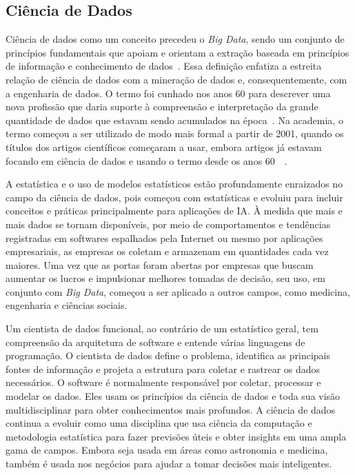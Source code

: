 \documentclass[portugues]{ic-tese}
\begin{document}
\subsection{Ciência de Dados}

Ciência de dados como um conceito precedeu o \textit{Big Data}, sendo um conjunto de princípios fundamentais que apoiam e orientam a extração baseada em princípios de informação e conhecimento de dados~\citep{Raban_2020}. Essa definição enfatiza a estreita relação de ciência de dados com a mineração de dados e, consequentemente, com a engenharia de dados. O termo foi cunhado nos anos 60 para descrever uma nova profissão que daria suporte à compreensão e interpretação da grande quantidade de dados que estavam sendo acumulados na época~\citep{Foote_2021}. Na academia, o termo começou a ser utilizado de modo mais formal a partir de 2001, quando os títulos dos artigos científicos começaram a usar, embora artigos já estavam focando em ciência de dados e usando o termo desde os anos 60~\citep{Raban_2020}~\citep{Foote_2021}. 

A estatística e o uso de modelos estatísticos estão profundamente enraizados no campo da ciência de dados, pois começou com estatísticas e evoluiu para incluir conceitos e práticas principalmente para aplicações de IA. À medida que mais e mais dados se tornam disponíveis, por meio de comportamentos e tendências registradas em softwares espalhados pela Internet ou mesmo por aplicações empresariais, as empresas os coletam e armazenam em quantidades cada vez maiores. Uma vez que as portas foram abertas por empresas que buscam aumentar os lucros e impulsionar melhores tomadas de decisão, seu uso, em conjunto com \textit{Big Data}, começou a ser aplicado a outros campos, como medicina, engenharia e ciências sociais.

Um cientista de dados funcional, ao contrário de um estatístico geral, tem compreensão da arquitetura de software e entende várias linguagens de programação. O cientista de dados define o problema, identifica as principais fontes de informação e projeta a estrutura para coletar e rastrear os dados necessários. O software é normalmente responsável por coletar, processar e modelar os dados. Eles usam os princípios da ciência de dados e toda sua visão multidisciplinar para obter conhecimentos mais profundos. A ciência de dados continua a evoluir como uma disciplina que usa ciência da computação e metodologia estatística para fazer previsões úteis e obter insights em uma ampla gama de campos. Embora seja usada em áreas como astronomia e medicina, também é usada nos negócios para ajudar a tomar decisões mais inteligentes.
\end{document}
